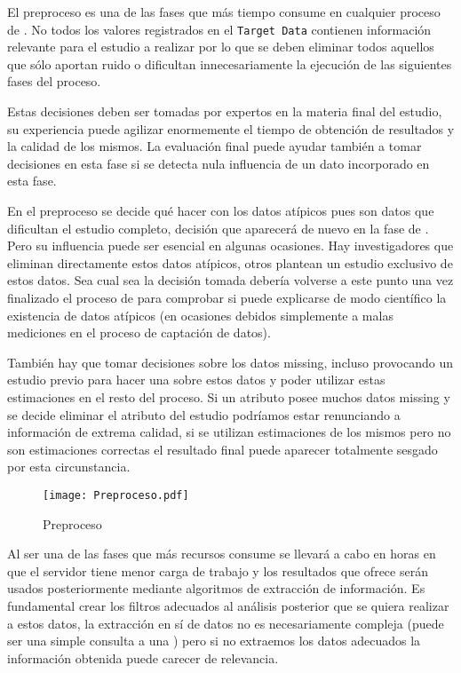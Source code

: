 
El preproceso es una de las fases que más tiempo consume en cualquier proceso de \KDD. No todos los valores registrados en el \texttt{Target Data} contienen información relevante para el estudio a realizar por lo que se deben eliminar todos aquellos que sólo aportan ruido o dificultan innecesariamente la ejecución de las siguientes fases del proceso.

Estas decisiones deben ser tomadas por expertos en la materia final del estudio, su experiencia puede agilizar enormemente el tiempo de obtención de resultados y la calidad de los mismos. La evaluación final puede ayudar también a tomar decisiones en esta fase si se detecta nula influencia de un dato incorporado en esta fase.

En el preproceso se decide qué hacer con los datos atípicos pues son datos que dificultan el estudio completo, decisión que aparecerá de nuevo en la fase de \dm. Pero su influencia puede ser esencial en algunas ocasiones. Hay investigadores que eliminan directamente estos datos atípicos, otros plantean un estudio exclusivo de estos datos. Sea cual sea la decisión tomada debería volverse a este punto una vez finalizado el proceso de \KDD para comprobar si puede explicarse de modo científico la existencia de datos atípicos (en ocasiones debidos simplemente a malas mediciones en el proceso de captación de datos).

También hay que tomar decisiones sobre los datos missing, incluso provocando un estudio previo para hacer una \prediccion sobre estos datos y poder utilizar estas estimaciones en el resto del proceso. Si un atributo posee muchos datos missing y se decide eliminar el atributo del estudio podríamos estar renunciando a información de extrema calidad, si se utilizan estimaciones de los mismos pero no son estimaciones correctas el resultado final puede aparecer totalmente sesgado por esta circunstancia.

\begin{wrapfigure}{o}{0.45\textwidth}
  \centering
  \texttt{[image: Preproceso.pdf]}
	\caption{Preproceso}
	\label{fig:Preproceso}
\end{wrapfigure}
Al ser una de las fases que más recursos consume se llevará a cabo en horas en que el servidor tiene menor carga de trabajo y los resultados que ofrece serán usados posteriormente mediante algoritmos de extracción de información. Es fundamental crear los filtros adecuados al análisis posterior que se quiera realizar a estos datos, la extracción en sí de datos no es necesariamente compleja (puede ser una simple consulta a una \db) pero si no extraemos los datos adecuados la información obtenida puede carecer de relevancia.

